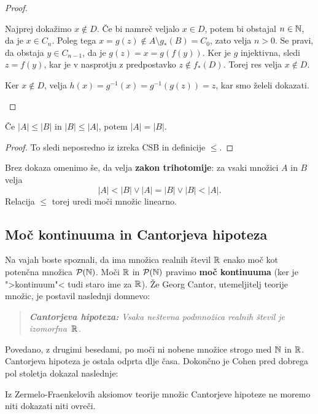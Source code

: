 \begin{proof}
\begin{enumerate}
    Najprej dokažimo $x \not\in D$. Če bi namreč veljalo $x \in D$, potem bi
    obstajal $n \in \mathbb{N}$, da je $x \in C_n$. Poleg tega
    $x = g(z) \not\in A \setminus g_{*}(B) = C_0$, zato velja $n > 0$. Se pravi,
    da obstaja $y \in C_{n-1}$, da je $g(z) = x = g(f(y))$. Ker je $g$
    injektivna, sledi $z = f(y)$, kar je v nasprotju z predpostavko
    $z \not\in f_{*}(D)$. Torej res velja $x \not\in D$.

    Ker $x \not\in D$, velja $h(x) = g^{-1}(x) = g^{-1}(g(z)) = z$, kar smo
    želeli dokazati.
  \end{enumerate}
\end{proof}

\begin{posledica}
  Če $|A| \leq |B|$ in $|B| \leq |A|$, potem $|A| = |B|$.
\end{posledica}

\begin{proof}
  To sledi neposredno iz izreka CSB in definicije $\leq$.
\end{proof}

Brez dokaza omenimo še, da velja \textbf{zakon trihotomije}: za vsaki množici $A$ in $B$
velja
%
\begin{equation*}
  |A| < |B| \lor |A| = |B| \lor |B| < |A|.
\end{equation*}
%
Relacija $\leq$ torej uredi moči množic linearno.



\subsection{Moč kontinuuma in Cantorjeva hipoteza}

Na vajah boste spoznali, da ima množica realnih števil $\mathbb{R}$ enako moč kot potenčna množica $\mathcal{P}(\mathbb{N})$. Moči $\mathbb{R}$ in $\mathcal{P}(\mathbb{N})$ pravimo \textbf{moč kontinuuma} (ker je ">kontinuum"< tudi staro ime za $\mathbb{R}$). Že Georg Cantor, utemeljitelj teorije množic, je postavil naslednji domnevo:
%
\begin{quote}
  \emph{\textbf{Cantorjeva hipoteza:} Vsaka neštevna podmnožica realnih števil je izomorfna~$\mathbb{R}$.}
\end{quote}
%
Povedano, z drugimi besedami, po moči ni nobene množice strogo med $\mathbb{N}$ in $\mathbb{R}$. Cantorjeva hipoteza je ostala odprta dlje časa. Dokončno je Cohen pred dobrega pol stoletja dokazal naslednje:

\begin{izrek}[Cohen]
  Iz Zermelo-Fraenkelovih aksiomov teorije množic Cantorjeve hipoteze ne moremo niti dokazati niti ovreči.
\end{izrek}

